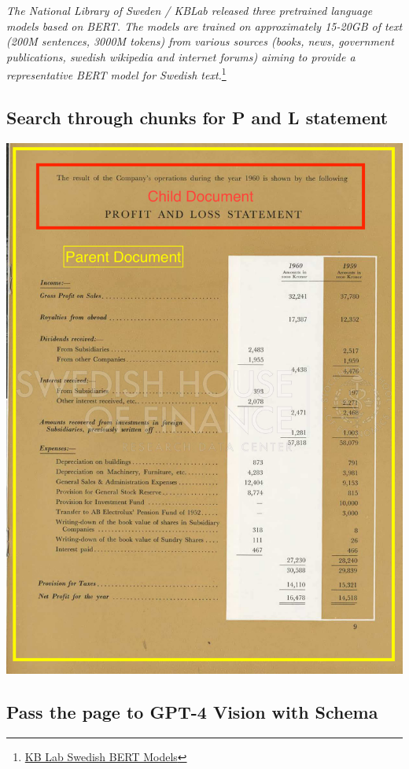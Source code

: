 \documentclass[
  letterpaper,
  DIV=11,
  numbers=noendperiod]{scrartcl}
\begin{document}
\emph{The National Library of Sweden / KBLab released three pretrained
language models based on BERT. The models are trained on approximately
15-20GB of text (200M sentences, 3000M tokens) from various sources
(books, news, government publications, swedish wikipedia and internet
forums) aiming to provide a representative BERT model for Swedish
text.}\footnote{\href{https://huggingface.co/KB/bert-base-swedish-cased}{KB
  Lab Swedish BERT Models}}

\hypertarget{search-through-chunks-for-p-and-l-statement}{%
\subsection{Search through chunks for P and L
statement}\label{search-through-chunks-for-p-and-l-statement}}

\includegraphics[width=1\textwidth,height=\textheight]{assets/Electrolux_1960_page_13.png}

\hypertarget{pass-the-page-to-gpt-4-vision-with-schema}{%
\subsection{Pass the page to GPT-4 Vision with
Schema}\label{pass-the-page-to-gpt-4-vision-with-schema}}
\end{document}
